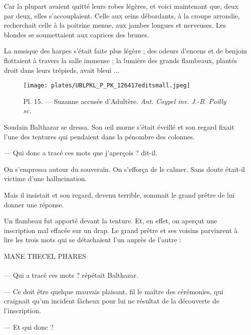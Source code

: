 \documentclass[a4paper, 11pt, oneside, polutonikogreek, french]{article}
\begin{document}
Car la plupart avaient quitté leurs robes légères, et voici maintenant que, deux par deux, elles s'accouplaient. Celle aux seins débordants, à la croupe arrondie, recherchait celle à la poitrine menue, aux jambes longues et nerveuses. Les blondes se soumettaient aux caprices des brunes.

La musique des harpes s'était faite plus légère ; des odeurs d'encens et de benjoin flottaient à travers la salle immense ; la lumière des grands flambeaux, plantés droit dans leurs trépieds, avait bleui ...

\bigskip
\centerline{\EightStarTaper}
\centerline{\EightStarTaper\EightStarTaper}
\bigskip
\clearpage
\begin{landscape}
\begin{figure}[H]
\centering
\texttt{[image: plates/UBLPKL\_P\_PK\_126417editsmall.jpeg]}
\caption{\Fontauri Pl. 15. --- Suzanne accusée d'Adultère. \emph{Ant. Coypel inv.} \emph{J.-B. Poilly sc.}}
\end{figure}
\end{landscape}
\clearpage
Soudain Balthazar se dressa. Son œil morne s'était éveillé et son regard fixait l'une des tentures qui pendaient dans la pénombre des colonnes.

--- Qui donc a tracé ces mots que j'aperçois ? dit-il.

On s'empressa autour du souverain. On s'efforça de le calmer. Sans doute était-il victime d'une hallucination.

Mais il insistait et son regard, devenu terrible, sommait le grand prêtre de lui donner une réponse.

Un flambeau fut apporté devant la tenture. Et, en effet, on aperçut une inscription mal effacée sur un drap. Le grand prêtre et ses voisins parvinrent à lire les trois mots qui se détachaient l'un auprès de l'autre :

\begin{center}
MANE THECEL PHARES
\end{center}
\paragraph{}
--- Qui a tracé ces mots ? répétait Balthazar.

--- Ce doit être quelque mauvais plaisant, fil le maître des cérémonies, qui craignait qu'un incident fâcheux pour lui ne résultat de la découverte de l'inscription.

--- Et qui donc ?
\end{document}
